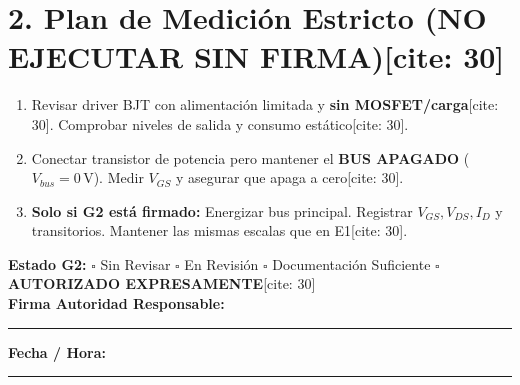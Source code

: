 \documentclass[10pt, a4paper, landscape]{article}
\begin{document}
\vspace{0.4cm}
\section*{2. Plan de Medición Estricto (NO EJECUTAR SIN FIRMA)[cite: 30]}
\begin{enumerate}
    \setlength\itemsep{0.2em}
    \item Revisar driver BJT con alimentación limitada y \textbf{sin MOSFET/carga}[cite: 30]. Comprobar niveles de salida y consumo estático[cite: 30].
    \item Conectar transistor de potencia pero mantener el \textbf{BUS APAGADO} ($V_{bus} = 0\,\text{V}$). Medir $V_{GS}$ y asegurar que apaga a cero[cite: 30].
    \item \textbf{Solo si G2 está firmado:} Energizar bus principal. Registrar $V_{GS}, V_{DS}, I_D$ y transitorios. Mantener las mismas escalas que en E1[cite: 30].
\end{enumerate}

\vspace{0.3cm}
\begin{tcolorbox}[colback=white, colframe=black, title=\textbf{Resolución Administrativa de Puerta G2[cite: 30]}]
    \textbf{Estado G2:} $\square$ Sin Revisar \quad $\square$ En Revisión \quad $\square$ Documentación Suficiente \quad $\square$ \textbf{AUTORIZADO EXPRESAMENTE}[cite: 30] \\[0.3cm]
    \textbf{Firma Autoridad Responsable:} \rule{4cm}{0.15mm} \quad \textbf{Fecha / Hora:} \rule{3cm}{0.15mm}
\end{tcolorbox}
\end{document}
